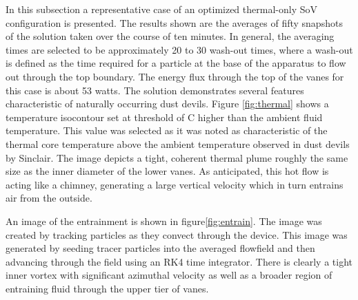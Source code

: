 In this subsection a representative case of an optimized thermal-only SoV
configuration is presented. 
The results shown are the averages of fifty snapshots of the solution 
taken over the course of ten minutes. In general, the averaging times
are selected to be approximately 20 to 30 wash-out times, where a
wash-out is defined as the time required for a particle at the base of
the apparatus to flow out through the top boundary. The energy flux
through the top of the vanes for this case is about 53 watts. The solution
demonstrates several features characteristic of naturally occurring dust
devils. Figure \ref{fig:thermal} shows a temperature isocontour set at
threshold of C higher than the ambient fluid temperature. This value was
selected as it was noted as characteristic of the thermal core
temperature above the ambient temperature observed in dust devils by
Sinclair\cite{Sinclair1969}. The image depicts a tight, coherent thermal
plume roughly the same size as the inner diameter of the lower vanes. As
anticipated, this hot flow is acting like a chimney, generating a large
vertical velocity which in turn entrains air from the outside. 

An image of the entrainment is shown in figure\ref{fig:entrain}. The
image was created by tracking particles as they 
convect through the device. This image was generated by seeding
tracer particles into the averaged flowfield and then advancing through
the field using an RK4 time integrator.  There is clearly a tight inner
vortex with significant azimuthal velocity as well as a broader region
of entraining fluid through the upper tier of vanes.  

